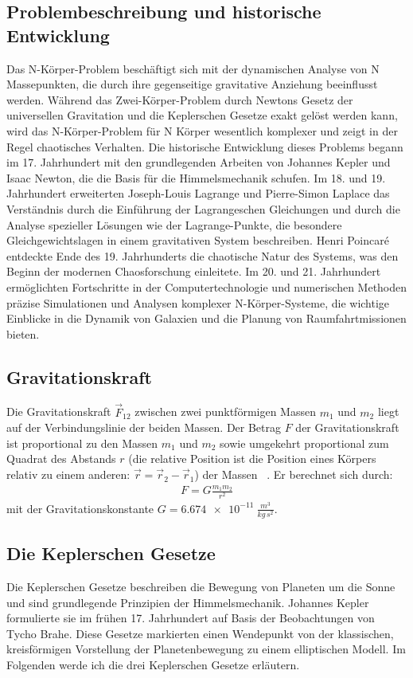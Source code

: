 \documentclass[a4paper,12pt,twoside]{article}
\begin{document}
\subsection{Problembeschreibung und historische Entwicklung}
Das N-Körper-Problem beschäftigt sich mit der dynamischen Analyse von N Massepunkten, die durch ihre gegenseitige gravitative Anziehung beeinflusst werden. Während das Zwei-Körper-Problem durch Newtons Gesetz der universellen Gravitation und die Keplerschen Gesetze exakt gelöst werden kann, wird das N-Körper-Problem für N Körper wesentlich komplexer und zeigt in der Regel chaotisches Verhalten. Die historische Entwicklung dieses Problems begann im 17. Jahrhundert mit den grundlegenden Arbeiten von Johannes Kepler und Isaac Newton, die die Basis für die Himmelsmechanik schufen. Im 18. und 19. Jahrhundert erweiterten Joseph-Louis Lagrange und Pierre-Simon Laplace das Verständnis durch die Einführung der Lagrangeschen Gleichungen und durch die Analyse spezieller Lösungen wie der Lagrange-Punkte, die besondere Gleichgewichtslagen in einem gravitativen System beschreiben. Henri Poincaré entdeckte Ende des 19. Jahrhunderts die chaotische Natur des Systems, was den Beginn der modernen Chaosforschung einleitete. Im 20. und 21. Jahrhundert ermöglichten Fortschritte in der Computertechnologie und numerischen Methoden präzise Simulationen und Analysen komplexer N-Körper-Systeme, die wichtige Einblicke in die Dynamik von Galaxien und die Planung von Raumfahrtmissionen bieten.

\subsection{Gravitationskraft}
Die Gravitationskraft $\vec{F}_{12}$ zwischen zwei punktförmigen Massen $m_1$ und $m_2$ liegt auf der Verbindungslinie der beiden Massen.
Der Betrag $F$ der Gravitationskraft ist proportional zu den Massen $m_1$ und $m_2$ sowie umgekehrt proportional zum Quadrat des Abstands $r$ 
(die relative Position ist die Position eines Körpers relativ zu einem anderen: \(\vec{r} = \vec{r}_2 - \vec{r}_1\)) der Massen ~\cite{LeifiPhysikGravitation}. Er berechnet sich durch:
\begin{align*}
	F = G \frac{m_1 m_2}{r^2}
\end{align*}
mit der Gravitationskonstante $G = \SI{6.674e-11}{\frac{m^3}{kg\,s^2}}$.

\subsection{Die Keplerschen Gesetze}
Die Keplerschen Gesetze beschreiben die Bewegung von Planeten um die Sonne und sind grundlegende Prinzipien der Himmelsmechanik. Johannes Kepler formulierte sie im frühen 17. Jahrhundert auf Basis der Beobachtungen von Tycho Brahe. Diese Gesetze markierten einen Wendepunkt von der klassischen, kreisförmigen Vorstellung der Planetenbewegung zu einem elliptischen Modell. Im Folgenden werde ich die drei Keplerschen Gesetze erläutern.
~\cite{LeifiPhysikKepler}
\end{document}
